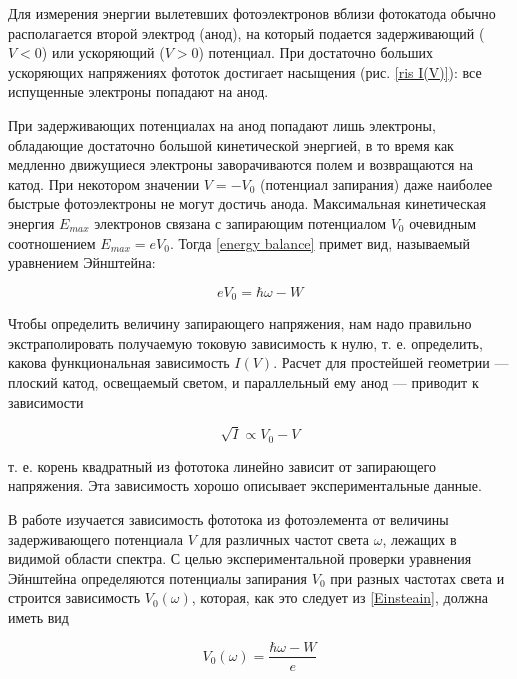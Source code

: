 \documentclass[a4paper, 12pt]{article}
\begin{document}
Для измерения энергии вылетевших фотоэлектронов вблизи фотокатода
обычно располагается второй электрод
(анод), на который подается задерживающий ($ V < 0 $) или ускоряющий ($ V >
0 $) потенциал. При достаточно больших
ускоряющих напряжениях фототок достигает насыщения (рис. \ref{ris I(V)}): все испущенные электроны попадают на анод.

При задерживающих потенциалах на анод попадают лишь электроны,
обладающие достаточно большой кинетической энергией, в то время
как медленно движущиеся электроны заворачиваются полем и возвращаются на катод. При некотором значении $ V = -V_0 $ (потенциал запирания) даже наиболее быстрые фотоэлектроны не могут достичь
анода.
Максимальная кинетическая энергия $ E_{max} $ электронов связана с
запирающим потенциалом $ V_0 $ очевидным соотношением $ E_{max} = eV_0 $. Тогда \eqref{energy balance} примет вид, называемый уравнением Эйнштейна:

\begin{equation}\label{Einsteain}
    eV_0 = \hbar\omega - W 
\end{equation}

Чтобы определить величину запирающего
напряжения, нам надо правильно экстраполировать получаемую токовую зависимость к нулю, т. е. определить, какова функциональная
зависимость $ I(V) $. Расчет для простейшей геометрии --- плоский катод, освещаемый светом, и параллельный ему анод --- приводит к зависимости

\begin{equation}\label{sqrt I = V}
    \sqrt{I} \propto V_0 - V
\end{equation}

т. е. корень квадратный из фототока линейно
зависит от запирающего напряжения. Эта зависимость хорошо описывает экспериментальные данные.

В работе изучается зависимость фототока из фотоэлемента от величины задерживающего потенциала $ V $ для различных частот света $ \omega $, лежащих в видимой области спектра. С целью экспериментальной
проверки уравнения Эйнштейна определяются потенциалы запирания
$ V_0 $ при разных частотах света и строится зависимость $ V_0(\omega) $, которая, как это следует из \eqref{Einsteain}, должна иметь вид

\begin{equation}\label{V(w)}
V_0 (\omega) = \dfrac{\hbar\omega - W}{e}
\end{equation}
\end{document}
